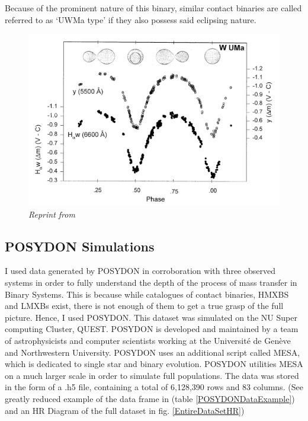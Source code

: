 \documentclass[12pt, a4paper]{article}
\begin{document}
        Because of the prominent nature of this binary, similar contact binaries are called referred to as `UWMa type' if they also possess said eclipsing nature. 

        \begin{figure}[H]
            \centering
            \includegraphics[scale= .3]{figs/reused-figs/WUMaLightcurve.png}
            \caption{\textit{Reprint from~\parencite{Morgan_1997}}}
            \label{WUMaLightcruve}
        \end{figure}


    \subsection{POSYDON Simulations}
         I used data generated by POSYDON \parencite{Fragos_2023} in corroboration with three observed systems in order to fully understand the depth of the process of mass transfer in Binary Systems. This is because while catalogues of contact binaries, HMXBS and LMXBs exist, there is not enough of them to get a true grasp of the full picture. Hence, I used POSYDON. This dataset was simulated on the NU Super computing Cluster, QUEST. POSYDON is developed and maintained by a team of astrophysicists and computer scientists working at the Université de Genève and Northwestern University. POSYDON uses an additional script called MESA, which is dedicated to single star and binary evolution. POSYDON utilities MESA on a much larger scale in order to simulate full populations. The data was stored in the form of a .h5 file, containing a total of 6,128,390 rows and 83 columns. (See greatly reduced example of the data frame in (table \ref{POSYDONDataExample}) and an HR Diagram of the full dataset in fig. \ref{EntireDataSetHR})
\end{document}
